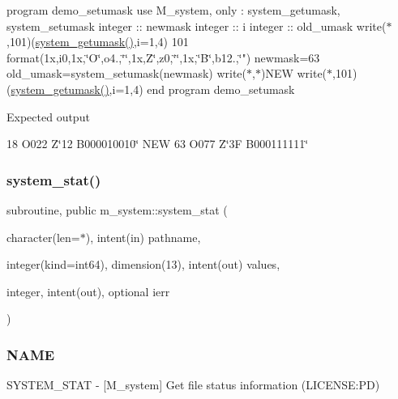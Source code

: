 program demo\+\_\+setumask use M\+\_\+system, only \+: system\+\_\+getumask, system\+\_\+setumask integer \+:\+: newmask integer \+:\+: i integer \+:\+: old\+\_\+umask write($\ast$,101)(\mbox{\hyperlink{namespacem__system_aa9ca951be39d2ea738d627cf42c00ddd}{system\+\_\+getumask()}},i=1,4) 101 format(1x,i0,1x,\char`\"{}\+O\textquotesingle{}\char`\"{},o4.,\char`\"{}\textquotesingle{}\char`\"{},1x,\textquotesingle{}Z\char`\"{}\textquotesingle{},z0,\char`\"{}\textquotesingle{}\char`\"{},1x,\char`\"{}B\textquotesingle{}\char`\"{},b12.,\char`\"{}\textquotesingle{}") newmask=63 old\+\_\+umask=system\+\_\+setumask(newmask) write($\ast$,$\ast$)\textquotesingle{}N\+EW\textquotesingle{} write($\ast$,101)(\mbox{\hyperlink{namespacem__system_aa9ca951be39d2ea738d627cf42c00ddd}{system\+\_\+getumask()}},i=1,4) end program demo\+\_\+setumask

Expected output

18 O\textquotesingle{}022\textquotesingle{} Z\char`\"{}12\textquotesingle{} B\textquotesingle{}000010010\char`\"{} N\+EW 63 O\textquotesingle{}077\textquotesingle{} Z\char`\"{}3\+F\textquotesingle{} B\textquotesingle{}000111111\char`\"{} \mbox{\label{namespacem__system_a5bb1ebcebe181e07fd24e908cacc9887}} 
\subsubsection{\texorpdfstring{system\+\_\+stat()}{system\_stat()}}
{\footnotesize\ttfamily subroutine, public m\+\_\+system\+::system\+\_\+stat (\begin{DoxyParamCaption}\item[{character(len=$\ast$), intent(in)}]{pathname,  }\item[{integer(kind=int64), dimension(13), intent(out)}]{values,  }\item[{integer, intent(out), optional}]{ierr }\end{DoxyParamCaption})}



\subsubsection*{N\+A\+ME}

S\+Y\+S\+T\+E\+M\+\_\+\+S\+T\+AT -\/ \mbox{[}M\+\_\+system\mbox{]} Get file status information (L\+I\+C\+E\+N\+SE\+:PD) 

